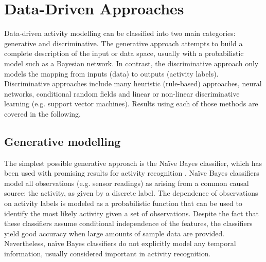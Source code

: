 \section{Data-Driven Approaches}
\label{sec:soa:datadriven}

Data-driven activity modelling can be classified into two main categories: generative and discriminative. The generative approach attempts to build a complete description of the input or data space, usually with a probabilistic model such as a Bayesian network. In contrast, the discriminative approach only models the mapping from inputs (data) to outputs (activity labels). Discriminative approaches include many heuristic (rule-based) approaches, neural networks, conditional random fields and linear or non-linear discriminative learning (e.g. support vector machines). Results using each of those methods are covered in the following.

\subsection{Generative modelling}

The simplest possible generative approach is the Na\"ive Bayes classifier, which has been used with promising results for activity recognition \cite{Bao2004} \cite{Brdiczka2007} \cite{Cook2009} \cite{Tapia2004} \cite{Kasteren2007} \cite{Maurer2006a}. Na\"ive Bayes classifiers model all observations (e.g. sensor readings) as arising from a common causal source: the activity, as given by a discrete label. The dependence of observations on activity labels is modeled as a probabilistic function that can be used to identify the most likely activity given a set of observations. Despite the fact that these classifiers assume conditional independence of the features, the classifiers yield good accuracy when large amounts of sample data are provided. Nevertheless, na\"ive Bayes classifiers do not explicitly model any temporal information, usually considered important in activity recognition.

